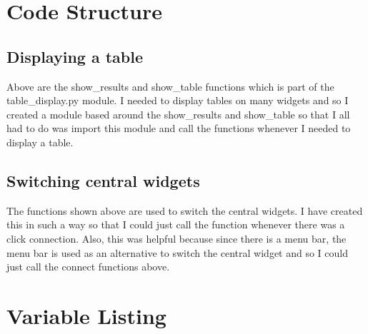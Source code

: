 \section{Code Structure}


\subsection{Displaying a table}
\begin{figure}[H]
\end{figure}

Above are the show\_results and show\_table functions which is part of the table\_display.py module. I needed to display tables on many widgets and so I created a module based around the show\_results and show\_table so that I all had to do was import this module and call the functions whenever I needed to display a table.

\subsection{Switching central widgets}
\begin{figure}[H]
\end{figure}
The functions shown above are used to switch the central widgets. I have created this in such a way so that I could just call the function whenever there was a click connection. Also, this was helpful because since there is a menu bar, the menu bar is used as an alternative to switch the central widget and so I could just call the connect functions above. 
\section{Variable Listing}


